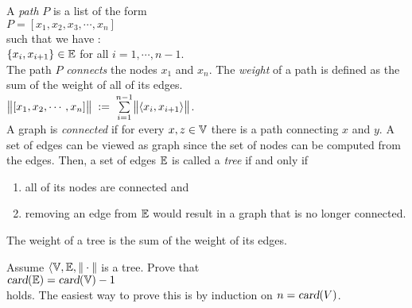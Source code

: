 \noindent
A \emph{path} $P$ is a list of the form 
\\[0.2cm]
\hspace*{1.3cm} 
$P = [ x_1, x_2, x_3, \cdots, x_n ]$ 
\\[0.2cm]
such that we have : \\[0.2cm]
\hspace*{1.3cm}
 $\{x_i,x_{i+1}\} \in {\mathbb E}$  \quad for all $i = 1, \cdots, n-1$.
\\[0.2cm]
The path $P$ \emph{connects} the nodes $x_1$ and $x_n$.  The \emph{weight} of a path is defined as
the sum of the weight of all of its edges.  
\\[0.2cm]
\hspace*{1.3cm}
 $\Weight{[x_1,x_2, \cdots, x_n]} \df \sum\limits_{i=1}^{n-1} \Weight{\pair(x_i,x_{i+1})}$. 
\\[0.2cm]
A graph is \emph{connected} if for every $x,z \in {\mathbb V}$ there is a path connecting $x$ and $y$.
A set of edges can be viewed as graph since the set of nodes can be computed from the edges.
Then, a set of edges ${\mathbb E}$ is called a \emph{tree} if and only if
\begin{enumerate}
\item all of its nodes are connected \quad and
\item removing an edge from ${\mathbb E}$ would result in a graph that is no longer connected.
\end{enumerate}
The weight of a tree is the sum of the weight of its edges.

\exercise
Assume $\langle {\mathbb V}, {\mathbb E}, \|\cdot\|$ is a tree.  Prove that 
\\[0.2cm]
\hspace*{1.3cm}
$\textsl{card}({\mathbb E}) = \textsl{card}({\mathbb V}) - 1$
\\[0.2cm]
holds.  The easiest way to prove this is by induction on $n = \textsl{card}(V)$. \eox


